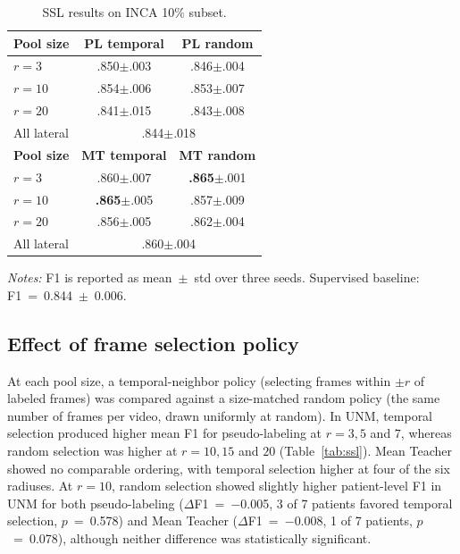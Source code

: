 \documentclass[a4paper,fleqn]{cas-dc}
\begin{document}
\begin{table}[!t]
\centering
\caption{SSL results on INCA 10\% subset.}
\label{tab:inca_pool}
\footnotesize
\begin{tabular}{@{}lcc@{}}
\toprule
\textbf{Pool size} & \textbf{PL temporal} & \textbf{PL random} \\
\midrule
$r{=}3$        & .850$\pm$.003 & .846$\pm$.004 \\
$r{=}10$       & .854$\pm$.006 & .853$\pm$.007 \\
$r{=}20$       & .841$\pm$.015 & .843$\pm$.008 \\
All lateral    & \multicolumn{2}{c}{.844$\pm$.018} \\
\midrule
\textbf{Pool size} & \textbf{MT temporal} & \textbf{MT random} \\
\midrule
$r{=}3$        & .860$\pm$.007 & \textbf{.865}$\pm$.001 \\
$r{=}10$       & \textbf{.865}$\pm$.005 & .857$\pm$.009 \\
$r{=}20$       & .856$\pm$.005 & .862$\pm$.004 \\
All lateral    & \multicolumn{2}{c}{.860$\pm$.004} \\
\bottomrule
\end{tabular}
\medskip
\noindent\begin{minipage}{\linewidth}
\footnotesize\textit{Notes:} F1 is reported as mean~$\pm$~std over three seeds. Supervised baseline: F1~=~0.844~$\pm$~0.006.
\end{minipage}
\end{table}

\subsection{Effect of frame selection policy}

At each pool size, a temporal-neighbor policy (selecting frames within $\pm r$ of labeled frames) was compared against a size-matched random policy (the same number of frames per video, drawn uniformly at random).
In UNM, temporal selection produced higher mean F1 for pseudo-labeling at $r{=}3, 5$ and $7$, whereas random selection was higher at $r{=}10, 15$ and $20$ (Table~\ref{tab:ssl}). Mean Teacher showed no comparable ordering, with temporal selection higher at four of the six radiuses.
At $r{=}10$, random selection showed slightly higher patient-level F1 in UNM for both pseudo-labeling ($\Delta$F1~=~$-$0.005, 3 of 7 patients favored temporal selection, $p$~=~0.578) and Mean Teacher ($\Delta$F1~=~$-$0.008, 1 of 7 patients, $p$~=~0.078), although neither difference was statistically significant.
\end{document}
